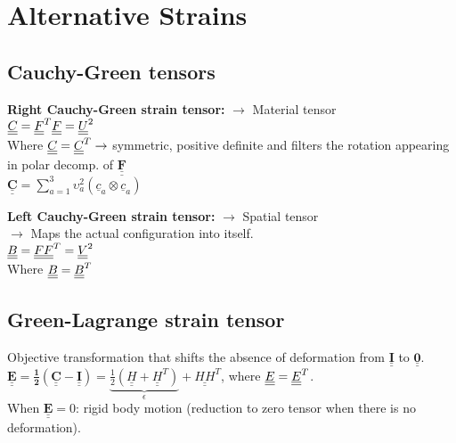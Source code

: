 \section{Alternative Strains}
\subsection*{Cauchy-Green tensors}
\smallskip

\textbf{Right Cauchy-Green strain tensor:} $\rightarrow$ Material tensor \\
$\underline{\underline{C}} = \tensor[]{\underline{\underline{F}}}{^T} \underline{\underline{F}} = \underline{\underline{U}}^2 $ \\
Where $\underline{\underline{C}} = \tensor[]{\underline{\underline{C}}}{^T} \rightarrow $ symmetric, positive definite and filters the rotation appearing in polar decomp. of $\underline{\underline{\mathbf{F}}}$ \\
$ \underline{\underline{\mathbf{C}}} = \sum \limits_{a=1}^{3} \upsilon_{a}^{2} (\underline{c}_a \otimes \underline{c}_a) $



\textbf{Left Cauchy-Green strain tensor:} $\rightarrow$ Spatial tensor \\
$\rightarrow$ Maps the actual configuration into itself. \\
$\underline{\underline{B}} = \underline{\underline{F}} \tensor[]{\underline{\underline{F}}}{^T} = \underline{\underline{V}}^2$ \\
Where $\underline{\underline{B}} = \tensor[]{\underline{\underline{B}}}{^T}$ \\
\smallskip

\subsection*{Green-Lagrange strain tensor}
\smallskip
Objective transformation that shifts the absence of deformation from $\underline{\underline{\mathbf{I}}}$ to $\underline{\underline{\mathbf{0}}}$. \\
$ \mathbf{\underline{\underline{E}}} = \mathbf{\frac{1}{2}(\underline{\underline{C}} - \underline{\underline{I}})}  = \underbrace{\frac{1}{2} (\underline{\underline{H}} + \underline{\underline{H}}^T)}_{\text{$\epsilon$}} +  \underline{\underline{HH}}^T$, \qquad
where $\underline{\underline{E}} = \tensor[]{\underline{\underline{E}}}{^T}$. \\
When $\mathbf{\underline{\underline{E}}} =0$: rigid body motion (reduction to zero tensor when there is no deformation).

